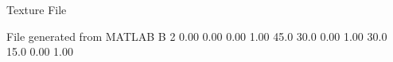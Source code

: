 Texture File

File generated from MATLAB
B 2
   0.00   0.00   0.00  1.00
   45.0   30.0   0.00  1.00
   30.0   15.0   0.00  1.00
